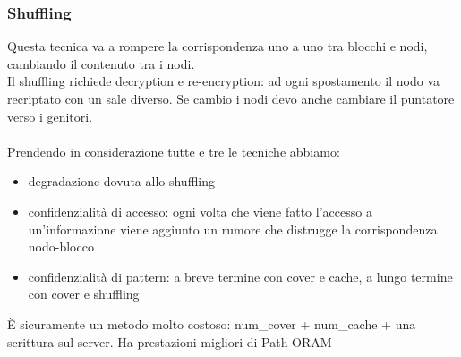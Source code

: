 \subsubsection{Shuffling}
Questa tecnica va a rompere la corrispondenza uno a uno tra blocchi e nodi, cambiando il contenuto tra i nodi. \\Il shuffling richiede decryption e re-encryption: ad ogni spostamento il nodo va recriptato con un sale diverso. Se cambio i nodi devo anche cambiare il puntatore verso i genitori.\\\\

Prendendo in considerazione tutte e tre le tecniche abbiamo:
\begin{itemize}
    \item degradazione dovuta allo shuffling
    \item confidenzialità di accesso: ogni volta che viene fatto l'accesso a un'informazione viene aggiunto un rumore che distrugge la corrispondenza nodo-blocco
    \item confidenzialità di pattern: a breve termine con cover e cache, a lungo termine con cover e shuffling
\end{itemize}
È sicuramente un metodo molto costoso: num\_cover + num\_cache + una scrittura sul server. Ha prestazioni migliori di Path ORAM